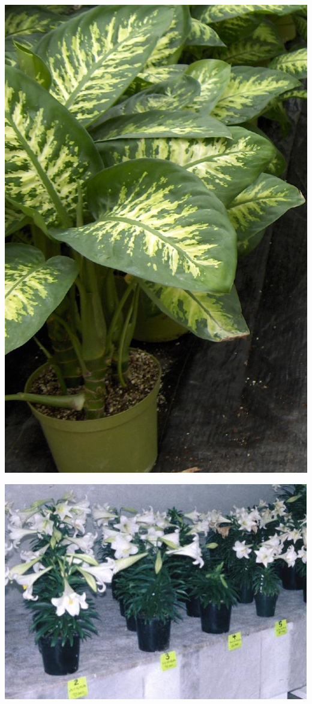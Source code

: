 \documentclass{article}
\begin{document}
\begin{center}
\includegraphics[width=0.9\textheight, angle=90]{../Dieffenbachia1.jpg}
\end{center}
\newpage

\begin{center}
\includegraphics[width=0.9\textheight, angle=90]{../EasterLily.jpg}
\end{center}
\newpage
\end{document}
